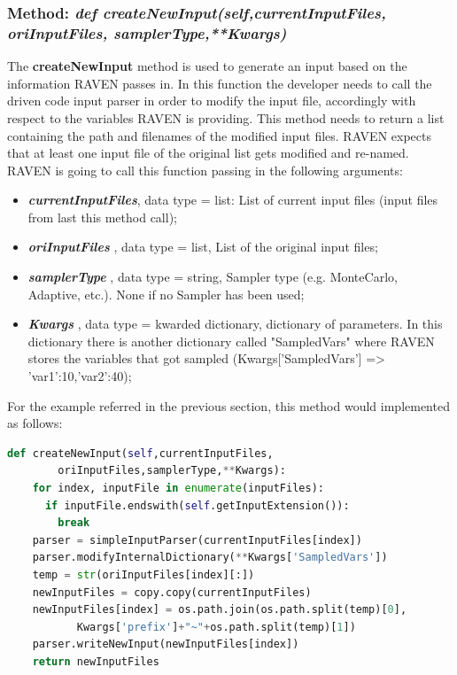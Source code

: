 \subsubsection{Method: \textit{def createNewInput(self,currentInputFiles,
                                       \\oriInputFiles, samplerType,**Kwargs)}} 
\label{subsubsec:generateCommand}
The \textbf{createNewInput} method is used to generate an input based 
on the information RAVEN passes in. In this function the developer needs to 
call the driven code input parser in order to modify the input file, accordingly with
respect to the variables RAVEN is providing. This method needs to return a list containing 
the path and filenames of the modified input files. \nb RAVEN expects that at least one input 
file of the original list gets modified and re-named.
\\RAVEN is going to call this function passing in the following arguments:
\begin{itemize}
  \item \textbf{\textit{currentInputFiles}}, data type = list: List of current 
              input files (input files from last this method call);
  \item \textbf{\textit{oriInputFiles}} , data type = list, List of the original input files; 
  \item  \textbf{\textit{samplerType}} , data type = string, Sampler type (e.g. MonteCarlo,
               Adaptive, etc.). \nb None if no Sampler has been used;
  \item  \textbf{\textit{Kwargs}} , data type = kwarded dictionary, dictionary of parameters.
               In this dictionary there is another dictionary
               called "SampledVars" where RAVEN stores the 
               variables that got sampled 
               (Kwargs['SampledVars'] => {'var1':10,'var2':40});
\end{itemize}
For the example referred in the previous section, this method would implemented as follows:
\newline
\begin{lstlisting}[language=python]
  def createNewInput(self,currentInputFiles,
        oriInputFiles,samplerType,**Kwargs):
    for index, inputFile in enumerate(inputFiles):
      if inputFile.endswith(self.getInputExtension()):
        break
    parser = simpleInputParser(currentInputFiles[index])
    parser.modifyInternalDictionary(**Kwargs['SampledVars'])
    temp = str(oriInputFiles[index][:])
    newInputFiles = copy.copy(currentInputFiles)
    newInputFiles[index] = os.path.join(os.path.split(temp)[0],
           Kwargs['prefix']+"~"+os.path.split(temp)[1])
    parser.writeNewInput(newInputFiles[index])
    return newInputFiles
\end{lstlisting} 
